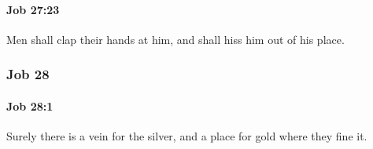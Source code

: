 		\paragraph{Job 27:23} %
			\label{JOB-27-23}

			Men shall clap their hands at him, and shall hiss him out of his place.

	\subsubsection{Job 28} %
		\label{JOB-28}

		\paragraph{Job 28:1} %
			\label{JOB-28-1}

			Surely there is a vein for the silver, and a place for gold where they fine it.


